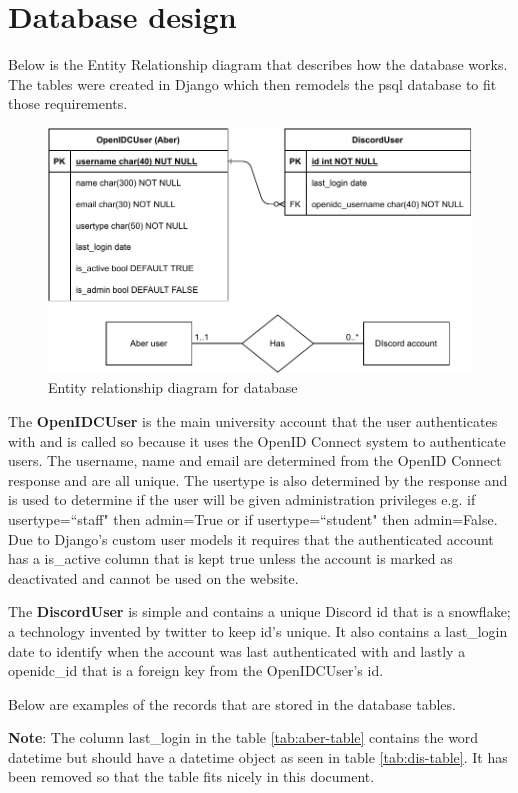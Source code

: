 \section{Database design}\label{sec2:database}
Below is the Entity Relationship diagram that describes how the database works. The tables were created in Django which then remodels the psql \cite{psql} database to fit those requirements. 

\begin{figure}[H]
	\centering
	\includegraphics[width=0.8\linewidth]{Figures/database-er-0}
	\caption{Entity relationship diagram for database}
	\label{fig:database-er}
\end{figure}
The \textbf{OpenIDCUser} is the main university account that the user authenticates with and is called so because it uses the OpenID Connect \cite{OpenID} system to authenticate users. The username, name and email are determined from the OpenID Connect response and are all unique. The usertype is also determined by the response and is used to determine if the user will be given administration privileges e.g. if usertype=``staff" then admin=True or if usertype=``student" then admin=False. Due to Django's custom user models it requires that the authenticated account has a is\_active column that is kept true unless the account is marked as deactivated and cannot be used on the website.

The \textbf{DiscordUser} is simple and contains a unique Discord id that is a snowflake; a technology invented by twitter to keep id's unique. It also contains a last\_login date to identify when the account was last authenticated with and lastly a openidc\_id that is a foreign key from the OpenIDCUser's id.

Below are examples of the records that are stored in the database tables. 

\textbf{Note}: The column last\_login in the table \ref{tab:aber-table} contains the word datetime but should have a datetime object as seen in table \ref{tab:dis-table}. It has been removed so that the table fits nicely in this document.

